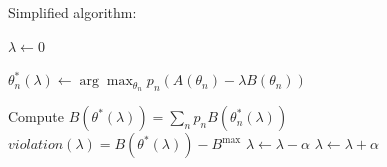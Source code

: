 \documentclass{article}
\begin{document}
Simplified algorithm:
\begin{algorithm}
    \caption{Lagrangian Relaxation}
    \begin{algorithmic}[1]

        \State $\lambda \gets 0$
        
        \Repeat
                \State
                $\displaystyle
                \theta_n^*(\lambda)
                \gets
                \arg\max_{\theta_n}
                p_n \left(
                A(\theta_n)
                - \lambda B(\theta_n)
                \right)
                $
            \EndFor

            \State Compute 
            $\displaystyle
            B(\theta^*(\lambda)) = \sum_n p_n B(\theta_n^*(\lambda))
            $
            \State $violation(\lambda) = B(\theta^*(\lambda)) - B^\text{max}$
                \State $\lambda \gets \lambda - \alpha$
                \State $\lambda \gets \lambda + \alpha$
            \EndIf

    \end{algorithmic}
\end{algorithm}
\end{document}
